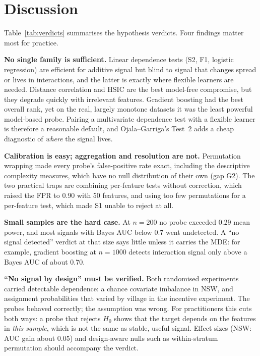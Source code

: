 

\FloatBarrier
\section{Discussion}
\label{sec:discussion}

Table~\ref{tab:verdicts} summarises the hypothesis verdicts. Four findings matter most for practice.

\textbf{No single family is sufficient.} Linear dependence tests (S2, F1, logistic regression) are efficient for additive signal but blind to signal that changes spread or lives in interactions, and the latter is exactly where flexible learners are needed. Distance correlation and HSIC are the best model-free compromise, but they degrade quickly with irrelevant features. Gradient boosting had the best overall rank, yet on the real, largely monotone datasets it was the least powerful model-based probe. Pairing a multivariate dependence test with a flexible learner is therefore a reasonable default, and Ojala--Garriga's Test~2 adds a cheap diagnostic of \emph{where} the signal lives.

\textbf{Calibration is easy; aggregation and resolution are not.} Permutation wrapping made every probe's false-positive rate exact, including the descriptive complexity measures, which have no null distribution of their own (gap G2). The two practical traps are combining per-feature tests without correction, which raised the FPR to 0.90 with 50 features, and using too few permutations for a per-feature test, which made S1 unable to reject at all.

\textbf{Small samples are the hard case.} At $n=200$ no probe exceeded 0.29 mean power, and most signals with Bayes AUC below 0.7 went undetected. A ``no signal detected'' verdict at that size says little unless it carries the MDE: for example, gradient boosting at $n=1000$ detects interaction signal only above a Bayes AUC of about 0.70.

\textbf{``No signal by design'' must be verified.} Both randomised experiments carried detectable dependence: a chance covariate imbalance in NSW, and assignment probabilities that varied by village in the incentive experiment. The probes behaved correctly; the assumption was wrong. For practitioners this cuts both ways: a probe that rejects $H_0$ shows that the target depends on the features in \emph{this sample}, which is not the same as stable, useful signal. Effect sizes (NSW: AUC gain about 0.05) and design-aware nulls such as within-stratum permutation should accompany the verdict.

